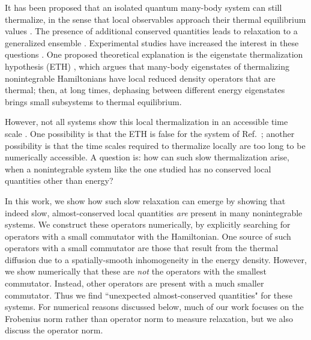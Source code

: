 \documentclass[twocolumn,superscriptaddress, prb]{revtex4-1}
\begin{document}
It has been proposed that an isolated quantum many-body system can still thermalize, in the sense that local observables approach their thermal equilibrium values \cite{Deutsch:1991,Srednicki:1994,Rigol:2008}.  The presence of additional conserved quantities leads to relaxation to a generalized ensemble \cite{Rigol:2007,Calabrese:2011,Gogolin:2011,Fagotti:2014}.  Experimental studies have increased the interest in these questions \cite{Polkovnikov:2011, Yukalov:2011}.  One proposed theoretical explanation is the eigenstate thermalization hypothesis (ETH) \cite{Deutsch:1991,Srednicki:1994,Rigol:2008,Santos:2010,Rigol:2012,Kruczenski:2013,Beugeling:2014,Sorg:2014,Kim_ETH,Goldstein:2014}, which argues that many-body eigenstates of thermalizing nonintegrable Hamiltonians have local reduced density operators that are thermal; then, at long times, dephasing between different energy eigenstates brings small subsystems to thermal equilibrium.

However, not all systems show this local thermalization in an accessible time scale \cite{Banuls:2011}.
One possibility is that the ETH is false for the system of Ref.~; another possibility is that the time scales required to thermalize locally are too long to be numerically accessible.  A question is: how can such slow thermalization arise, when a nonintegrable system like the one studied has no conserved local quantities other than energy?

In this work, we show how such slow relaxation can emerge by showing that indeed slow, almost-conserved local quantities {\it are} present in many nonintegrable systems.  We construct these operators numerically, by explicitly searching for operators with a small commutator with the Hamiltonian.  One source of such operators with a small commutator are those that result from the thermal diffusion due to a spatially-smooth inhomogeneity in the energy density.  However, we show numerically that these are {\it not} the operators with the smallest commutator.  Instead, other operators are present with a much smaller commutator.  Thus we find ``unexpected almost-conserved quantities" for these systems.  For numerical reasons discussed below, much of our work focuses on the Frobenius norm rather than operator norm to measure relaxation, but we also discuss the operator norm.
\end{document}
